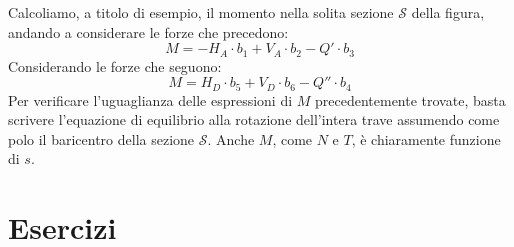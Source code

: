 \noindent Calcoliamo, a titolo di esempio, il momento nella solita sezione $\mathcal{S}$ della figura, andando a considerare le forze che precedono:
\begin{equation} \label{equazione11-6}
\boxed{ M = -H_{A}\cdot b_{1} + V_{A}\cdot b_{2} - Q'\cdot b_{3} } \tag{11.6}
\end{equation}
Considerando le forze che seguono: 
\begin{equation} \label{equazione11-7}
\boxed{ M = H_{D}\cdot b_{5} + V_{D}\cdot b_{6} - Q''\cdot b_{4} } \tag{11.7}
\end{equation}
Per verificare l'uguaglianza delle espressioni di $M$ precedentemente trovate, basta scrivere l'equazione di equilibrio alla rotazione dell'intera trave assumendo come polo il baricentro della sezione $\mathcal{S}$. Anche $M$, come $N$ e $T$, è chiaramente funzione di $s$. 
\clearpage
\section{Esercizi}
